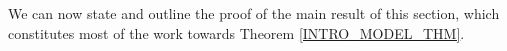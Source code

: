 \documentclass[a4paper,10pt
,draft
]{article}%
\renewcommand{\F}{\mathcal F}
\renewcommand{\1}{\eta}%
\begin{document}



We can now state and outline the proof of the main result of this section,
which constitutes most of the work towards Theorem \ref{INTRO_MODEL_THM}. %
\end{document}
